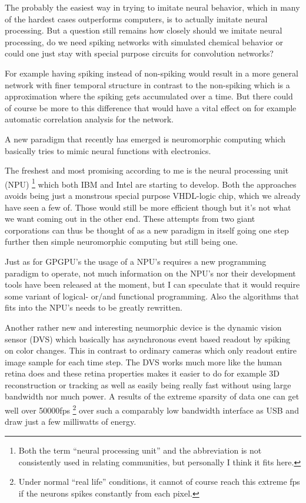 \documentclass{article}
\begin{document}
    The probably the easiest way in trying to imitate neural behavior, 
    which in many of the hardest cases outperforms computers, is to actually
    imitate neural processing. But a question still remains how closely should
    we imitate neural processing, do we need spiking networks with simulated
    chemical behavior or could one just stay with special purpose circuits 
    for convolution networks?

    For example having spiking instead of non-spiking would result in a more
    general network with finer temporal structure in contrast to the 
    non-spiking which is a approximation where the spiking gets accumulated 
    over a time. But there could of course be more to this difference that
    would have a vital effect on for example automatic correlation analysis for
    the network.

    A new paradigm that recently has emerged is neuromorphic
    computing which basically tries to mimic neural functions with electronics.
    
    The freshest and most promising according to me is the 
    neural processing unit (NPU)
    \footnote{Both the term ``neural processing unit'' and the abbreviation is
    not consistently used in relating communities, but personally I think it
    fits here.} 
    which both IBM\cite{synapse} and
    Intel\cite{intelneuro} are starting to develop. Both the approaches avoids 
    being just a monstrous special purpose VHDL-logic chip,
    which we already have seen a few of. Those would still be more efficient
    though but it's not what we want coming out in the other end.
    These attempts from two giant corporations can thus be thought of as a new 
    paradigm in itself going one step further then simple neuromorphic 
    computing but still being one.

    Just as for GPGPU's the usage of a NPU's requires a new programming 
    paradigm to operate, not much information on the NPU's nor their 
    development tools have been released at the moment, but I can speculate 
    that it would require some variant of logical- or/and functional 
    programming. Also the algorithms that fits into the NPU's needs to be 
    greatly rewritten.
    
    Another rather new and interesting neumorphic device is the
    dynamic vision sensor (DVS) which basically has asynchronous event based
    readout by spiking on color changes.\cite{dvs} This in contrast to ordinary
    cameras which only readout entire image sample for each time step. 
    The DVS works much more like the human retina does and
    these retina properties makes it easier to do for example 3D reconstruction
    or tracking\cite{dvs3D} as well as easily
    being really fast without using large bandwidth nor much power. A results
    of the extreme sparsity of data one can get well over 50000fps
    \footnote{Under normal ``real life'' conditions, it cannot of course reach 
    this extreme fps if the neurons spikes constantly from each pixel.}
    over such a comparably low bandwidth interface as USB and draw just a few
    milliwatts of energy.\cite{dvs}
\end{document}
